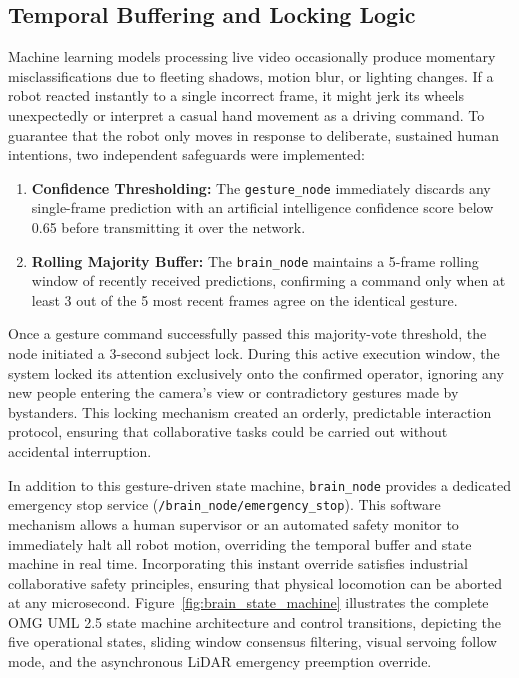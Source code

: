 \subsection{Temporal Buffering and Locking Logic}
\label{sec:temporal_buffering}
Machine learning models processing live video occasionally produce momentary misclassifications due to fleeting shadows, motion blur, or lighting changes. If a robot reacted instantly to a single incorrect frame, it might jerk its wheels unexpectedly or interpret a casual hand movement as a driving command. To guarantee that the robot only moves in response to deliberate, sustained human intentions, two independent safeguards were implemented:
\begin{enumerate}
    \item \textbf{Confidence Thresholding:} The \texttt{gesture\_node} immediately discards any single-frame prediction with an artificial intelligence confidence score below 0.65 before transmitting it over the network.
    \item \textbf{Rolling Majority Buffer:} The \texttt{brain\_node} maintains a 5-frame rolling window of recently received predictions, confirming a command only when at least 3 out of the 5 most recent frames agree on the identical gesture.
\end{enumerate}

Once a gesture command successfully passed this majority-vote threshold, the node initiated a 3-second subject lock. During this active execution window, the system locked its attention exclusively onto the confirmed operator, ignoring any new people entering the camera's view or contradictory gestures made by bystanders. This locking mechanism created an orderly, predictable interaction protocol, ensuring that collaborative tasks could be carried out without accidental interruption.

In addition to this gesture-driven state machine, \texttt{brain\_node} provides a dedicated emergency stop service (\texttt{/brain\_node/emergency\_stop}). This software mechanism allows a human supervisor or an automated safety monitor to immediately halt all robot motion, overriding the temporal buffer and state machine in real time. Incorporating this instant override satisfies industrial collaborative safety principles, ensuring that physical locomotion can be aborted at any microsecond. Figure~\ref{fig:brain_state_machine} illustrates the complete OMG UML 2.5 state machine architecture and control transitions, depicting the five operational states, sliding window consensus filtering, visual servoing follow mode, and the asynchronous LiDAR emergency preemption override.

